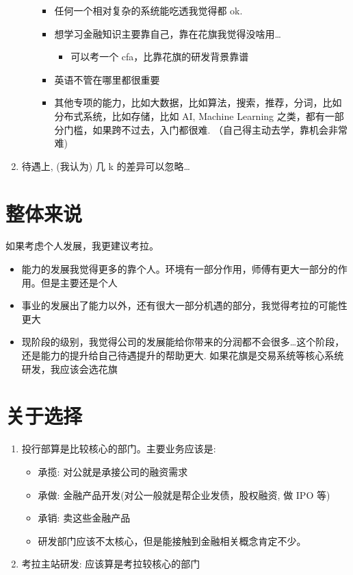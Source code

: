 \documentclass[11pt,a4paper]{article}
\begin{document}
\begin{enumerate}
\begin{itemize}
\begin{itemize}
\item 任何一个相对复杂的系统能吃透我觉得都 ok.
\item 想学习金融知识主要靠自己，靠在花旗我觉得没啥用\ldots{}
\begin{itemize}
\item 可以考一个 cfa，比靠花旗的研发背景靠谱
\end{itemize}
\item 英语不管在哪里都很重要
\item 其他专项的能力，比如大数据，比如算法，搜索，推荐，分词，比如分布式系统，比如存储，比如 AI, Machine Learning 之类，都有一部分门槛，如果跨不过去，入门都很难. （自己得主动去学，靠机会非常难)
\end{itemize}
\end{itemize}
\item 待遇上, (我认为) 几 k 的差异可以忽略\ldots{}
\end{enumerate}

\section{整体来说}
\label{sec:orged68684}
如果考虑个人发展，我更建议考拉。
\begin{itemize}
\item 能力的发展我觉得更多的靠个人。环境有一部分作用，师傅有更大一部分的作用。但是主要还是个人
\item 事业的发展出了能力以外，还有很大一部分机遇的部分，我觉得考拉的可能性更大
\item 现阶段的级别，我觉得公司的发展能给你带来的分润都不会很多\ldots{}这个阶段，还是能力的提升给自己待遇提升的帮助更大. 如果花旗是交易系统等核心系统研发，我应该会选花旗
\end{itemize}


\section{关于选择}
\label{sec:orgf58528e}
\begin{enumerate}
\item 投行部算是比较核心的部门。主要业务应该是:
\begin{itemize}
\item 承揽: 对公就是承接公司的融资需求
\item 承做: 金融产品开发(对公一般就是帮企业发债，股权融资, 做 IPO 等)
\item 承销: 卖这些金融产品
\item 研发部门应该不太核心，但是能接触到金融相关概念肯定不少。
\end{itemize}
\item 考拉主站研发: 应该算是考拉较核心的部门
\end{enumerate}
\end{document}
